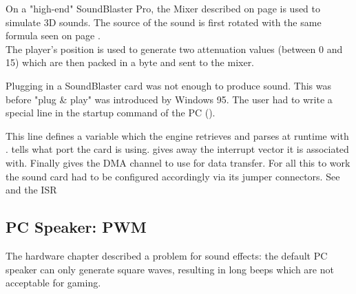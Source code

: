On a "high-end" SoundBlaster Pro, the Mixer described on page \pageref{sbmixerpage} is used to simulate 3D sounds. The source of the sound is first rotated with the same formula seen on page \pageref{rotatematrix}.\\
The player's position is used to generate two attenuation values (between 0 and 15) which are then packed in a byte and sent to the mixer.\\
\par 
\begin{minipage}{\textwidth}

\end{minipage}
\par
{} Plugging in a SoundBlaster card was not enough to produce sound. This was before "plug \& play" was introduced by Windows 95. The user had to write a special line in the startup command of the PC ().\\
\par 
\begin{minipage}{\textwidth}

\end{minipage}
\par
This line defines a variable  which the engine retrieves and parses at runtime with .  tells what port the card is using.  gives away the interrupt vector it is associated with. Finally  gives the DMA channel to use for data transfer. For all this to work the sound card had to be configured accordingly via its jumper connectors.
See  and the ISR  




 
\subsection{PC Speaker: PWM}
The hardware chapter described a problem for sound effects: the default PC speaker can only generate square waves, resulting in long beeps which are not acceptable for gaming.\\


